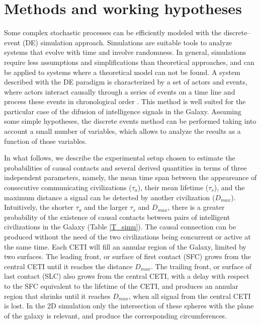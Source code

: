 \documentclass[crop]{CSLB}%
\begin{document}



\section{Methods and working hypotheses}


Some complex stochastic processes can be efficiently modeled with the
discrete--event (DE) simulation approach.
%
Simulations are suitable tools to analyze systems that evolve with
time and involve randomness.
%
In general, simulations require less assumptions and simplifications
than theoretical approaches, and can be applied to systems where a
theoretical model can not be found.
%
A system described with the DE paradigm is characterized by a set of
actors and events, where actors interact causally through a series of
events on a time line and process these events in chronological order
\citep{ptolemaeus_system_2014, chung_simulation_2003,
simulation_ross_2012}.
%
This method is well suited for the 
particular case of the difusion of intelligence signals in
the Galaxy.
%
Assuming some simple hypotheses, 
the discrete events method can be performed taking into
account a small number of variables, which allows to analyze the
results as a function of those variables.


In what follows, we describe the experimental setup chosen to estimate
the probabilities of causal contacts and several derived quantities in
terms of three independent parameters, namely, the mean time span
between the appeareance of consecutive communicating civilizations
($\tau_a$), their mean lifetime ($\tau_s$), and the maximum distance a
signal can be detected by another civilization ($D_{max}$).
%
Intuitively, the shorter $\tau_a$ and the larger $\tau_s$ and
$D_{max}$, there is a greater probability of the existence of causal
contacts between pairs of intelligent civilizations in the Galaxy
(Table \ref{T_simu}).
%
The causal connection can be produced without the need of the two
civilizations being concurrent or active at the same time.
%
Each CETI will fill an annular region of the Galaxy, limited by two
surfaces.
%
The leading front, or surface of first contact (SFC) grows from the
central CETI until it reaches the distance $D_{max}$.
%
The trailing front, or surface of last contact (SLC) also grows from
the central CETI, with a delay with respect to the SFC equivalent to
the lifetime of the CETI, and produces an annular region that shrinks
until it reaches $D_{max}$, when all signal from the central CETI is
lost.
%
In the 2D simulation only the intersection of these spheres with the
plane of the galaxy is relevant, and produce the corresponding
circumferences.
\end{document}
